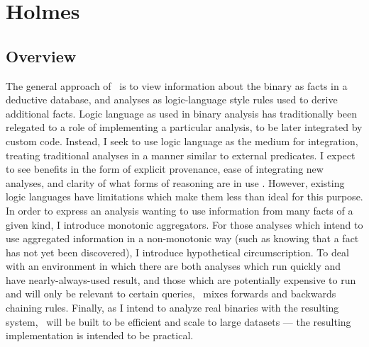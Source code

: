 \chapter{Holmes}
\section{Overview}
The general approach of \sysname\ is to view information about the binary as facts in a deductive database, and analyses as logic-language style rules used to derive additional facts.
Logic language as used in binary analysis has traditionally been relegated to a role of implementing a particular analysis, to be later integrated by custom code.
Instead, I seek to use logic language as the medium for integration, treating traditional analyses in a manner similar to external predicates.
I expect to see benefits in the form of explicit provenance, ease of integrating new analyses, and clarity of what forms of reasoning are in use .
However, existing logic languages have limitations which make them less than ideal for this purpose.
In order to express an analysis wanting to use information from many facts of a given kind, I introduce monotonic aggregators.
For those analyses which intend to use aggregated information in a non-monotonic way (such as knowing that a fact has not yet been discovered), I introduce hypothetical circumscription.
To deal with an environment in which there are both analyses which run quickly and have nearly-always-used result, and those which are potentially expensive to run and will only be relevant to certain queries, \sysname\ mixes forwards and backwards chaining rules.
Finally, as I intend to analyze real binaries with the resulting system, \sysname\ will be built to be efficient and scale to large datasets --- the resulting implementation is intended to be practical.

